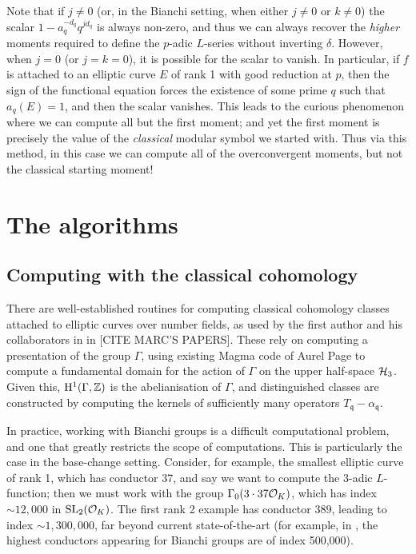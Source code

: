 \documentclass[a4paper,11pt]{article}
\numberwithin{equation}{section}
\begin{document}
\begin{remark}
Note that if $j \neq 0$ (or, in the Bianchi setting, when either $j \neq 0$ or $k \neq 0$) the scalar $1-a_q^{-d_q}q^{jd_q}$ is always non-zero, and thus we can always recover the \emph{higher} moments required to define the $p$-adic $L$-series without inverting $\delta$. However, when $j = 0$ (or $j=k=0$), it is possible for the scalar to vanish. In particular, if $f$ is attached to an elliptic curve $E$ of rank 1 with good reduction at $p$, then the sign of the functional equation forces the existence of some prime $q$ such that $a_q(E) = 1$, and then the scalar vanishes. This leads to the curious phenomenon where we can compute all but the first moment; and yet the first moment is precisely the value of the \emph{classical} modular symbol we started with. Thus via this method, in this case we can compute all of the overconvergent moments, but not the classical starting moment!
\end{remark}



\section{The algorithms}

\subsection{Computing with the classical cohomology}
There are well-established routines for computing classical cohomology classes attached to elliptic curves over number fields, as used by the first author and his collaborators in in [CITE MARC'S PAPERS]. These rely on computing a presentation of the group $\Gamma$, using existing Magma code of Aurel Page to compute a fundamental domain for the action of $\Gamma$ on the upper half-space $\mathcal{H}_3$. Given this, $\mathrm{H}^1(\Gamma,\mathbb{Z})$ is the abelianisation of $\Gamma$, and distinguished classes are constructed by computing the kernels of sufficiently many operators $T_{\mathfrak{q}} - \alpha_{\mathfrak{q}}.$ 

In practice, working with Bianchi groups is a difficult computational problem, and one that greatly restricts the scope of computations. This is particularly the case in the base-change setting. Consider, for example, the smallest elliptic curve of rank 1, which has conductor 37, and say we want to compute the $3$-adic $L$-function; then we must work with the group $\Gamma_0(3\cdot 37\mathcal{O}_K)$, which has index $\sim 12,000$ in $\mathrm{SL}_2(\mathcal{O}_K)$. The first rank 2 example has conductor $389$, leading to index $\sim 1,300,000$, far beyond current state-of-the-art (for example, in \cite{LMFDB}, the highest conductors appearing for Bianchi groups are of index 500,000).
\end{document}
